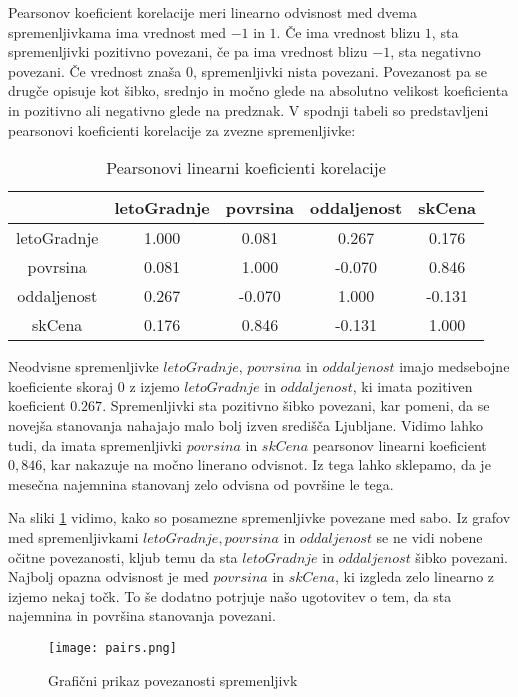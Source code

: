 \documentclass[a4paper, 12pt]{article}
\begin{document}
Pearsonov koeficient korelacije meri linearno odvisnost med dvema
spremenljivkama ima vrednost med $ -1 $ in $ 1 $. Če ima vrednost blizu
$ 1 $, sta spremenljivki pozitivno povezani, če pa ima vrednost blizu $ -1 $,
sta negativno povezani. Če vrednost znaša $ 0 $, spremenljivki nista
povezani. Povezanost pa se drugče opisuje kot šibko, srednjo in močno glede na
absolutno velikost koeficienta in pozitivno ali negativno glede na predznak.
V spodnji tabeli so predstavljeni pearsonovi koeficienti korelacije za zvezne
spremenljivke:
\begin{table}[H]
\begin{center}
\caption{Pearsonovi linearni koeficienti korelacije}
\begin{tabular}{ c|cccc }
	& letoGradnje & povrsina & oddaljenost & skCena \\
	\hline
	letoGradnje & 1.000 & 0.081 & 0.267 & 0.176 \\
	povrsina & 0.081 & 1.000 & -0.070 & 0.846 \\
	oddaljenost & 0.267 & -0.070 & 1.000 & -0.131 \\
	skCena & 0.176 & 0.846 & -0.131 & 1.000 \\
\end{tabular}
\end{center}
\end{table}

Neodvisne spremenljivke $ letoGradnje $, $ povrsina $ in
$ oddaljenost $ imajo medsebojne koeficiente skoraj $ 0 $ z izjemo
$ letoGradnje $ in $ oddaljenost $, ki imata pozitiven koeficient
$ 0.267 $. Spremenljivki sta pozitivno šibko povezani, kar pomeni, da se
novejša stanovanja nahajajo malo bolj izven središča Ljubljane. Vidimo lahko
tudi, da imata spremenljivki $ povrsina $ in $ skCena $ pearsonov linearni
koeficient $ 0,846 $, kar nakazuje na močno linerano odvisnot. Iz tega lahko
sklepamo, da je mesečna najemnina stanovanj zelo odvisna od površine le tega.

Na sliki \ref{figure:2} vidimo, kako so posamezne spremenljivke povezane med
sabo. Iz grafov med spremenljivkami $ letoGradnje, povrsina $ in $ oddaljenost $
se ne vidi nobene očitne povezanosti, kljub temu da sta $ letoGradnje $ in
$ oddaljenost $ šibko povezani. Najbolj opazna odvisnost je med $ povrsina $ in
$ skCena $, ki izgleda zelo linearno z izjemo nekaj točk. To še dodatno
potrjuje našo ugotovitev o tem, da sta najemnina in površina stanovanja
povezani.

\begin{figure}[H]
	\centering
	\texttt{[image: pairs.png]}
	\caption{Grafični prikaz povezanosti spremenljivk}
	\label{figure:2}
\end{figure}
\end{document}
